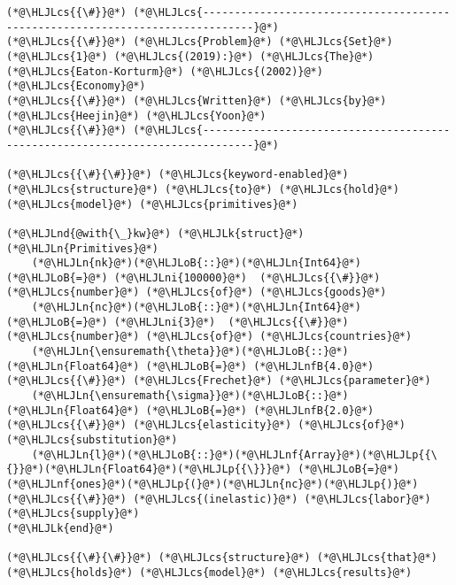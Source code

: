 \documentclass[12pt,a4paper]{article}
\newcommand{\HLJLk}[1]{\textcolor[RGB]{148,91,176}{\textbf{#1}}}
\newcommand{\HLJLn}[1]{#1}
\newcommand{\HLJLnd}[1]{\textcolor[RGB]{214,102,97}{#1}}
\newcommand{\HLJLnf}[1]{\textcolor[RGB]{66,102,213}{#1}}
\newcommand{\HLJLnfB}[1]{\textcolor[RGB]{59,151,46}{#1}}
\newcommand{\HLJLni}[1]{\textcolor[RGB]{59,151,46}{#1}}
\newcommand{\HLJLoB}[1]{\textcolor[RGB]{102,102,102}{\textbf{#1}}}
\newcommand{\HLJLp}[1]{#1}
\newcommand{\HLJLcs}[1]{\textcolor[RGB]{153,153,119}{\textit{#1}}}
\begin{document}
\begin{lstlisting}
(*@\HLJLcs{{\#}}@*) (*@\HLJLcs{------------------------------------------------------------------------------}@*)
(*@\HLJLcs{{\#}}@*) (*@\HLJLcs{Problem}@*) (*@\HLJLcs{Set}@*) (*@\HLJLcs{1}@*) (*@\HLJLcs{(2019):}@*) (*@\HLJLcs{The}@*) (*@\HLJLcs{Eaton-Korturm}@*) (*@\HLJLcs{(2002)}@*) (*@\HLJLcs{Economy}@*)
(*@\HLJLcs{{\#}}@*) (*@\HLJLcs{Written}@*) (*@\HLJLcs{by}@*) (*@\HLJLcs{Heejin}@*) (*@\HLJLcs{Yoon}@*)
(*@\HLJLcs{{\#}}@*) (*@\HLJLcs{------------------------------------------------------------------------------}@*)

(*@\HLJLcs{{\#}{\#}}@*) (*@\HLJLcs{keyword-enabled}@*) (*@\HLJLcs{structure}@*) (*@\HLJLcs{to}@*) (*@\HLJLcs{hold}@*) (*@\HLJLcs{model}@*) (*@\HLJLcs{primitives}@*)

(*@\HLJLnd{@with{\_}kw}@*) (*@\HLJLk{struct}@*) (*@\HLJLn{Primitives}@*)
    (*@\HLJLn{nk}@*)(*@\HLJLoB{::}@*)(*@\HLJLn{Int64}@*) (*@\HLJLoB{=}@*) (*@\HLJLni{100000}@*)  (*@\HLJLcs{{\#}}@*) (*@\HLJLcs{number}@*) (*@\HLJLcs{of}@*) (*@\HLJLcs{goods}@*)
    (*@\HLJLn{nc}@*)(*@\HLJLoB{::}@*)(*@\HLJLn{Int64}@*) (*@\HLJLoB{=}@*) (*@\HLJLni{3}@*)  (*@\HLJLcs{{\#}}@*) (*@\HLJLcs{number}@*) (*@\HLJLcs{of}@*) (*@\HLJLcs{countries}@*)
    (*@\HLJLn{\ensuremath{\theta}}@*)(*@\HLJLoB{::}@*)(*@\HLJLn{Float64}@*) (*@\HLJLoB{=}@*) (*@\HLJLnfB{4.0}@*)  (*@\HLJLcs{{\#}}@*) (*@\HLJLcs{Frechet}@*) (*@\HLJLcs{parameter}@*)
    (*@\HLJLn{\ensuremath{\sigma}}@*)(*@\HLJLoB{::}@*)(*@\HLJLn{Float64}@*) (*@\HLJLoB{=}@*) (*@\HLJLnfB{2.0}@*)  (*@\HLJLcs{{\#}}@*) (*@\HLJLcs{elasticity}@*) (*@\HLJLcs{of}@*) (*@\HLJLcs{substitution}@*)
    (*@\HLJLn{l}@*)(*@\HLJLoB{::}@*)(*@\HLJLnf{Array}@*)(*@\HLJLp{{\{}}@*)(*@\HLJLn{Float64}@*)(*@\HLJLp{{\}}}@*) (*@\HLJLoB{=}@*) (*@\HLJLnf{ones}@*)(*@\HLJLp{(}@*)(*@\HLJLn{nc}@*)(*@\HLJLp{)}@*)  (*@\HLJLcs{{\#}}@*) (*@\HLJLcs{(inelastic)}@*) (*@\HLJLcs{labor}@*) (*@\HLJLcs{supply}@*)
(*@\HLJLk{end}@*)

(*@\HLJLcs{{\#}{\#}}@*) (*@\HLJLcs{structure}@*) (*@\HLJLcs{that}@*) (*@\HLJLcs{holds}@*) (*@\HLJLcs{model}@*) (*@\HLJLcs{results}@*)


\end{lstlisting}
\end{document}
